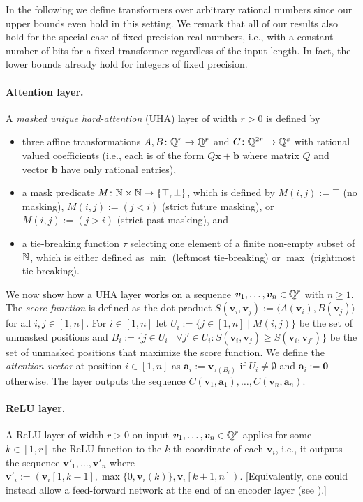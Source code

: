 \begin{remark}
In the following we define transformers over arbitrary rational numbers since our upper bounds even hold in this setting.
We remark that all of our results also hold for the special case of fixed-precision real numbers,
i.e., with a constant number of bits for a fixed transformer regardless of the input length.
In fact, the lower bounds already hold for integers of fixed precision.
\end{remark}

\paragraph{Attention layer.}
A \emph{masked unique hard-attention} (UHA) layer of width $r > 0$ is defined by 
\begin{itemize}
\item three affine transformations $A,B \colon \mathbb{Q}^r \to \mathbb{Q}^r$ and $C \colon \mathbb{Q}^{2r} \to \mathbb{Q}^s$ with rational valued coefficients
(i.e., each is of the form $Q\bm x + \bm b$ where matrix $Q$ and vector $\bm b$ have only rational entries),
\item a mask predicate $M \colon \mathbb{N} \times \mathbb{N} \to \{\top,\bot\}$, which is defined by
$M(i,j) := \top$ (no masking), $M(i,j) := (j < i)$ (strict future masking), or $M(i,j) := (j > i)$ (strict past masking), and
\item a tie-breaking function $\tau$ selecting one element of a finite non-empty subset of $\mathbb{N}$, 
which is either defined as $\min$ (leftmost tie-breaking) or $\max$ (rightmost tie-breaking).
\end{itemize}
We now show how a UHA layer works on a sequence $\bm v_1,\dots,\bm v_n \in \mathbb{Q}^r$ with $n \ge 1$.
The \emph{score function} is defined as the dot product 
$S(\bm v_i,\bm v_j) := \langle A(\bm v_i), B(\bm v_j) \rangle$ for all $i,j \in [1,n]$.
For $i \in [1,n]$ let $U_i := \{j \in [1,n] \mid M(i,j)\}$ be the set of unmasked positions and
$B_i := \{j \in U_i \mid \forall j' \in U_i \colon S(\bm v_i,\bm v_j) \ge S(\bm v_i,\bm v_{j'})\}$
be the set of unmasked positions that maximize the score function.
We define the \emph{attention vector} at position $i \in [1,n]$ as 
$\bm a_i := \bm v_{\tau(B_i)}$ if $U_i \ne \emptyset$ and $\bm a_i := \bm 0$ otherwise.
The layer outputs the sequence $C(\bm v_1,\bm a_1),\dots,C(\bm v_n,\bm a_n)$.

\paragraph{ReLU layer.}
A ReLU layer of width $r > 0$ on input $\bm v_1,\dots,\bm v_n \in \mathbb{Q}^r$ 
applies for some $k \in [1,r]$ the ReLU function to the $k$-th coordinate of each $\bm v_i$, i.e.,
it outputs the sequence $\bm v'_1,\dots,\bm v'_n$ where 
$\bm v'_i := (\bm v_i[1,k-1],\max\{0,\bm v_i(k)\},\bm v_i[k+1,n])$. 
[Equivalently, one could instead allow a feed-forward network at the end of an encoder layer 
(see \citep{Hao22,barcelo2024logical}).]

